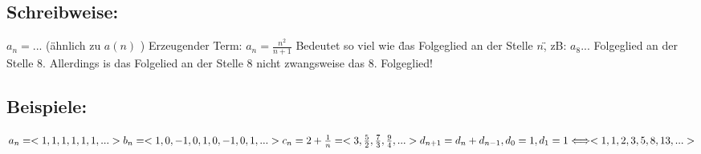 \documentclass[../mainfile.tex]{subfiles}
\begin{document}
\subsection*{Schreibweise:}
$a_n = ...$ (ähnlich zu $a(n)$ )
Erzeugender Term: $a_n = \frac{n^2}{n+1}$
Bedeutet so viel wie \"das Folgeglied an der Stelle $n$\", zB: $a_8...$ Folgeglied an der Stelle 8. Allerdings is das Folgelied an der Stelle 8 nicht zwangsweise das 8. Folgeglied!
\subsection*{Beispiele:}
$
a_n = <1, 1, 1, 1, 1, 1, ...>\\
b_n = <1, 0, -1 , 0, 1, 0, -1, 0, 1, ...>\\
c_n = 2+\frac{1}{n}= <3, \frac{5}{2}, \frac{7}{3}, \frac{9}{4}, ...>\\
d_{n+1} = d_n + d_{n-1}, d_0 = 1,  d_1=1  \Longleftrightarrow  <1, 1, 2, 3, 5, 8, 13, ...>
$\\
\end{document}
